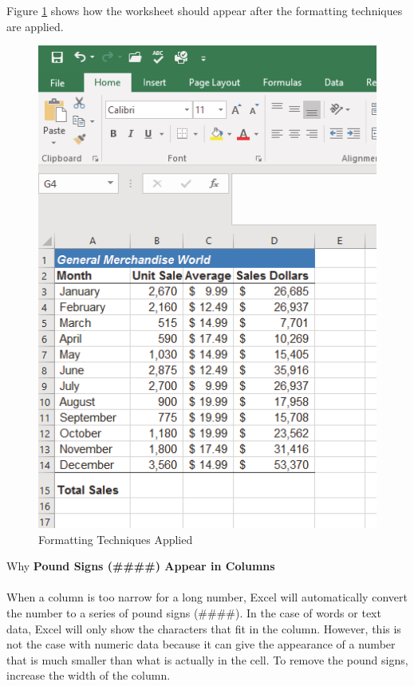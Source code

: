 Figure \ref{01:fig37} shows how the  worksheet should appear after the formatting techniques are applied.

\begin{figure}[H]
	\centering
	\includegraphics[width=\maxwidth{.95\linewidth}]{gfx/ch01_fig37}
	\caption{Formatting Techniques Applied}
	\label{01:fig37}
\end{figure}

\begin{center}
	\begin{infobox}{Why}
		\textbf{Pound Signs (\#\#\#\#) Appear in Columns}
		\\
		\\
		When a column is too narrow for a long number, Excel will automatically convert the number to a series of pound signs (\#\#\#\#). In the case of words or text data, Excel will only show the characters that fit in the column. However, this is not the case with numeric data because it can give the appearance of a number that is much smaller than what is actually in the cell. To remove the pound signs, increase the width of the column.
	\end{infobox}
\end{center}


